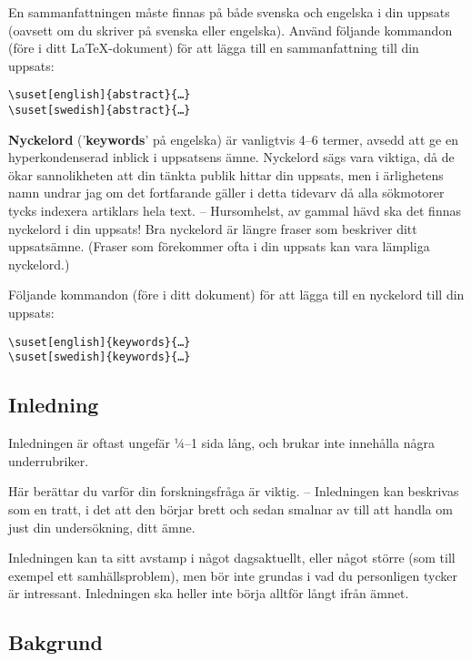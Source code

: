 En sammanfattningen måste finnas på både svenska och engelska i din uppsats
(oavsett om du skriver på svenska eller engelska). Använd följande kommandon
(före  i ditt \LaTeX-dokument) för att lägga till
en sammanfattning till din uppsats:

\begin{verbatim}
\suset[english]{abstract}{…}
\suset[swedish]{abstract}{…}
\end{verbatim}

\textbf{Nyckelord} ('\textbf{keywords}' på engelska) är vanligtvis 4--6 termer,
avsedd att ge en hyperkondenserad inblick i uppsatsens ämne. Nyckelord sägs
vara viktiga, då de ökar sannolikheten att din tänkta publik hittar din
uppsats, men i ärlighetens namn undrar jag om det fortfarande gäller i detta
tidevarv då alla sökmotorer tycks indexera artiklars hela text. -- Hursomhelst,
av gammal hävd ska det finnas nyckelord i din uppsats! Bra nyckelord är längre
fraser som beskriver ditt uppsatsämne. (Fraser som förekommer ofta i din
uppsats kan vara lämpliga nyckelord.)

Följande kommandon (före  i ditt dokument) för att
lägga till en nyckelord till din uppsats:

\begin{verbatim}
\suset[english]{keywords}{…}
\suset[swedish]{keywords}{…}
\end{verbatim}


\subsection{Inledning}
\label{rubrik.inledning}

Inledningen är oftast ungefär ¼--1 sida lång, och brukar inte innehålla några
underrubriker.

Här berättar du varför din forskningsfråga är viktig. – Inledningen kan
beskrivas som en tratt, i det att den börjar brett och sedan smalnar av till
att handla om just din undersökning, ditt ämne.

Inledningen kan ta sitt avstamp i något dagsaktuellt, eller något större (som
till exempel ett samhällsproblem), men bör inte grundas i vad du personligen
tycker är intressant. Inledningen ska heller inte börja alltför långt ifrån
ämnet.


\subsection{Bakgrund}
\label{rubrik.bakgrund}

